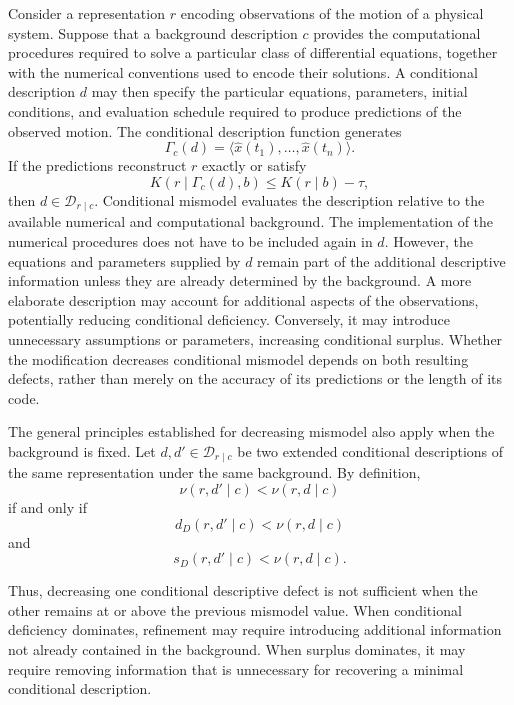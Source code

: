 \begin{example}
Consider a representation $r$ encoding observations of the motion of a physical system. Suppose that a background description $c$ provides the computational procedures required to solve a particular class of differential equations, together with the numerical conventions used to encode their solutions. A conditional description $d$ may then specify the particular equations, parameters, initial conditions, and evaluation schedule required to produce predictions of the observed motion. The conditional description function generates
\[
\Gamma_c(d) = \langle\hat{x}(t_1),\ldots,\hat{x}(t_n)\rangle.
\]
If the predictions reconstruct $r$ exactly or satisfy
\[
K(r\mid\Gamma_c(d),b)\le K(r\mid b)-\tau,
\]
then $d\in\mathcal D_{r\mid c}$. Conditional mismodel evaluates the description relative to the available numerical and computational background. The implementation of the numerical procedures does not have to be included again in $d$. However, the equations and parameters supplied by $d$ remain part of the additional descriptive information unless they are already determined by the background. A more elaborate description may account for additional aspects of the observations, potentially reducing conditional deficiency. Conversely, it
may introduce unnecessary assumptions or parameters, increasing conditional surplus. Whether the modification decreases conditional mismodel depends on both resulting defects, rather than merely on the accuracy of its
predictions or the length of its code.
\end{example}

The general principles established for decreasing mismodel also apply when the background is fixed. Let $d,d'\in\mathcal D_{r\mid c}$ be two extended conditional descriptions of the same representation under the same background. By definition,
\[
\nu(r,d'\mid c)<\nu(r,d\mid c)
\]
if and only if
\[
d_D(r,d'\mid c)<\nu(r,d\mid c)
\]
and
\[
s_D(r,d'\mid c)<\nu(r,d\mid c).
\]

Thus, decreasing one conditional descriptive defect is not sufficient when the other remains at or above
the previous mismodel value. When conditional deficiency dominates, refinement may require introducing additional information not already contained in the background. When surplus dominates, it may require removing information that is unnecessary for recovering a minimal conditional description.

